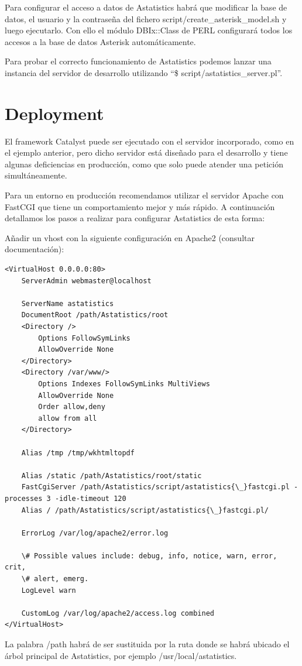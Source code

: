 \documentclass[spanish,12pt]{book}
\begin{document}
Para configurar el acceso a datos de Astatistics habrá que modificar la base de datos, el usuario y la contraseña del fichero script/create\_asterisk\_model.sh y luego ejecutarlo. Con ello el módulo DBIx::Class de PERL configurará todos los accesos a la base de datos Asterisk automáticamente.

Para probar el correcto funcionamiento de Astatistics podemos lanzar una instancia del servidor de desarrollo utilizando ``\$ script/astatistics\_server.pl''.

\section{Deployment}
El framework Catalyst puede ser ejecutado con el servidor incorporado, como en el ejemplo anterior, pero dicho servidor está diseñado para el desarrollo y tiene algunas deficiencias en producción, como que solo puede atender una petición simultáneamente.

Para un entorno en producción recomendamos utilizar el servidor Apache con FastCGI que tiene un comportamiento mejor y más rápido. A continuación detallamos los pasos a realizar para configurar Astatistics de esta forma:

Añadir un vhost con la siguiente configuración en Apache2 (consultar documentación):

\begin{lstlisting}
<VirtualHost 0.0.0.0:80>
	ServerAdmin webmaster@localhost
	
	ServerName astatistics
	DocumentRoot /path/Astatistics/root
	<Directory />
		Options FollowSymLinks
		AllowOverride None
	</Directory>
	<Directory /var/www/>
		Options Indexes FollowSymLinks MultiViews
		AllowOverride None
		Order allow,deny
		allow from all
	</Directory>

	Alias /tmp /tmp/wkhtmltopdf

	Alias /static /path/Astatistics/root/static
	FastCgiServer /path/Astatistics/script/astatistics{\_}fastcgi.pl -processes 3 -idle-timeout 120
	Alias /	/path/Astatistics/script/astatistics{\_}fastcgi.pl/

	ErrorLog /var/log/apache2/error.log

	\# Possible values include: debug, info, notice, warn, error, crit,
	\# alert, emerg.
	LogLevel warn

	CustomLog /var/log/apache2/access.log combined
</VirtualHost>
\end{lstlisting}

La palabra /path habrá de ser sustituida por la ruta donde se habrá ubicado el árbol principal de Astatistics, por ejemplo /usr/local/astatistics.
\end{document}
